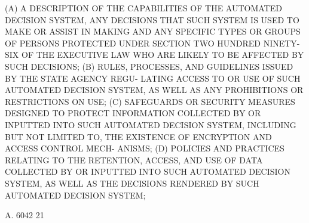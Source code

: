    (A)  A  DESCRIPTION  OF  THE  CAPABILITIES  OF  THE AUTOMATED DECISION
 SYSTEM, ANY DECISIONS THAT SUCH SYSTEM IS USED  TO  MAKE  OR  ASSIST  IN
 MAKING  AND  ANY  SPECIFIC  TYPES  OR  GROUPS OF PERSONS PROTECTED UNDER
 SECTION TWO HUNDRED NINETY-SIX OF THE EXECUTIVE LAW WHO ARE LIKELY TO BE
 AFFECTED BY SUCH DECISIONS;
   (B) RULES, PROCESSES, AND GUIDELINES ISSUED BY THE STATE AGENCY  REGU-
 LATING  ACCESS  TO  OR USE OF SUCH AUTOMATED DECISION SYSTEM, AS WELL AS
 ANY PROHIBITIONS OR RESTRICTIONS ON USE;
   (C) SAFEGUARDS OR SECURITY MEASURES DESIGNED  TO  PROTECT  INFORMATION
 COLLECTED  BY OR INPUTTED INTO SUCH AUTOMATED DECISION SYSTEM, INCLUDING
 BUT NOT LIMITED TO, THE EXISTENCE OF ENCRYPTION AND ACCESS CONTROL MECH-
 ANISMS;
   (D) POLICIES AND PRACTICES RELATING TO THE RETENTION, ACCESS, AND  USE
 OF DATA COLLECTED BY OR INPUTTED INTO SUCH AUTOMATED DECISION SYSTEM, AS
 WELL AS THE DECISIONS RENDERED BY SUCH AUTOMATED DECISION SYSTEM;

 A. 6042                            21
 
